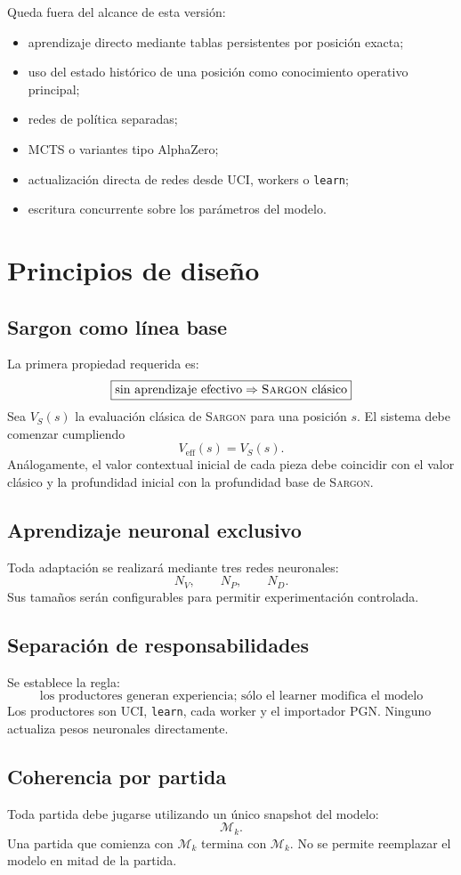 \documentclass[11pt,a4paper]{article}
\newcommand{\Sargon}{\textsc{Sargon}}
\newcommand{\Model}{\mathcal{M}}
\begin{document}
Queda fuera del alcance de esta versión:
\begin{itemize}
\item aprendizaje directo mediante tablas persistentes por posición exacta;
\item uso del estado histórico de una posición como conocimiento operativo principal;
\item redes de política separadas;
\item MCTS o variantes tipo AlphaZero;
\item actualización directa de redes desde UCI, workers o \texttt{learn};
\item escritura concurrente sobre los parámetros del modelo.
\end{itemize}

\section{Principios de diseño}
\subsection{Sargon como línea base}
La primera propiedad requerida es:
\[
\boxed{\text{sin aprendizaje efectivo}\Rightarrow\text{\Sargon{} clásico}}
\]
Sea $V_S(s)$ la evaluación clásica de \Sargon{} para una posición $s$. El sistema debe comenzar cumpliendo
\[
V_{\mathrm{eff}}(s)=V_S(s).
\]
Análogamente, el valor contextual inicial de cada pieza debe coincidir con el valor clásico y la profundidad inicial con la profundidad base de \Sargon{}.

\subsection{Aprendizaje neuronal exclusivo}
Toda adaptación se realizará mediante tres redes neuronales:
\[
N_V,\qquad N_P,\qquad N_D.
\]
Sus tamaños serán configurables para permitir experimentación controlada.

\subsection{Separación de responsabilidades}
Se establece la regla:
\[
\boxed{\text{los productores generan experiencia; sólo el learner modifica el modelo}}
\]
Los productores son UCI, \texttt{learn}, cada worker y el importador PGN. Ninguno actualiza pesos neuronales directamente.

\subsection{Coherencia por partida}
Toda partida debe jugarse utilizando un único snapshot del modelo:
\[
\Model_k.
\]
Una partida que comienza con $\Model_k$ termina con $\Model_k$. No se permite reemplazar el modelo en mitad de la partida.
\end{document}
